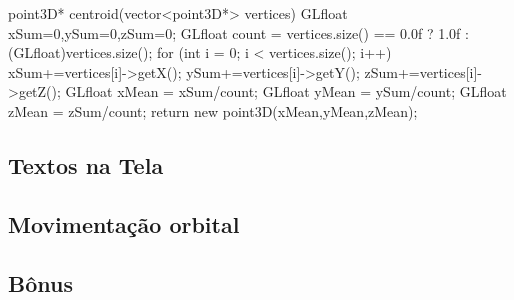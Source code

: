 \documentclass{article}
\begin{document}
\label{list:centroid}
point3D* centroid(vector<point3D*> vertices){
    GLfloat xSum=0,ySum=0,zSum=0;
    GLfloat count = vertices.size() == 0.0f ? 1.0f : (GLfloat)vertices.size();
    for (int i = 0; i < vertices.size(); i++) {
        xSum+=vertices[i]->getX();
        ySum+=vertices[i]->getY();
        zSum+=vertices[i]->getZ();
    }
    GLfloat xMean = xSum/count;
    GLfloat yMean = ySum/count;
    GLfloat zMean = zSum/count;
    return new point3D(xMean,yMean,zMean);
}




\subsection{Textos na Tela}
\subsection{Movimentação orbital}
\subsection{Bônus}
\label{sec:bonus}



\end{document}
